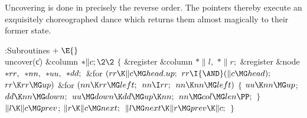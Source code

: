 Uncovering is done in precisely the reverse order. The
pointers thereby
execute an exquisitely choreo\-graphed dance which returns them almost
magically to their former state.

\Y\B\4:Subroutines\X${}\mathrel+\E{}$\6
\\{uncover}(\|c)\1\1\6
\&{column} ${}{*}\|c;\2\2{}$\6
${}\{{}$\5
\1\&{register} \&{column} ${}{*}\|l,{}$ ${}{*}\|r;{}$\6
\&{register} \&{node} ${}{*}\\{rr},{}$ ${}{*}\\{nn},{}$ ${}{*}\\{uu},{}$ ${}{*}%
\\{dd};{}$\7
\&{for} ${}(\\{rr}\K\|c\MG\\{head}.\\{up};{}$ ${}\\{rr}\I{\AND}(\|c\MG%
\\{head});{}$ ${}\\{rr}\K\\{rr}\MG\\{up}){}$\1\6
\&{for} ${}(\\{nn}\K\\{rr}\MG\\{left};{}$ ${}\\{nn}\I\\{rr};{}$ ${}\\{nn}\K%
\\{nn}\MG\\{left}){}$\5
${}\{{}$\1\6
${}\\{uu}\K\\{nn}\MG\\{up}{}$;\5
${}\\{dd}\K\\{nn}\MG\\{down};{}$\6
${}\\{uu}\MG\\{down}\K\\{dd}\MG\\{up}\K\\{nn};{}$\6
${}\\{nn}\MG\\{col}\MG\\{len}\PP;{}$\6
\4${}\}{}$\2\2\6
${}\|l\K\|c\MG\\{prev}{}$;\5
${}\|r\K\|c\MG\\{next};{}$\6
${}\|l\MG\\{next}\K\|r\MG\\{prev}\K\|c;{}$\6
\4${}\}{}$\2\par
\fi

